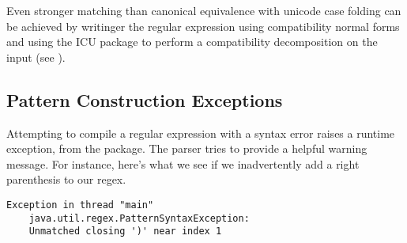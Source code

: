 Even stronger matching than canonical equivalence with unicode case
folding can be achieved by writinger the regular expression using
compatibility normal forms and using the ICU package to perform a
compatibility decomposition on the input (see
).


\subsection{Pattern Construction Exceptions}

Attempting to compile a regular expression with a syntax error raises
a runtime exception,  from the
 package.  The parser tries to provide a helpful
warning message.  For instance, here's what we see if we inadvertently
add a right parenthesis to our regex.
%
\begin{verbatim}
Exception in thread "main" 
    java.util.regex.PatternSyntaxException:  
    Unmatched closing ')' near index 1
\end{verbatim}







